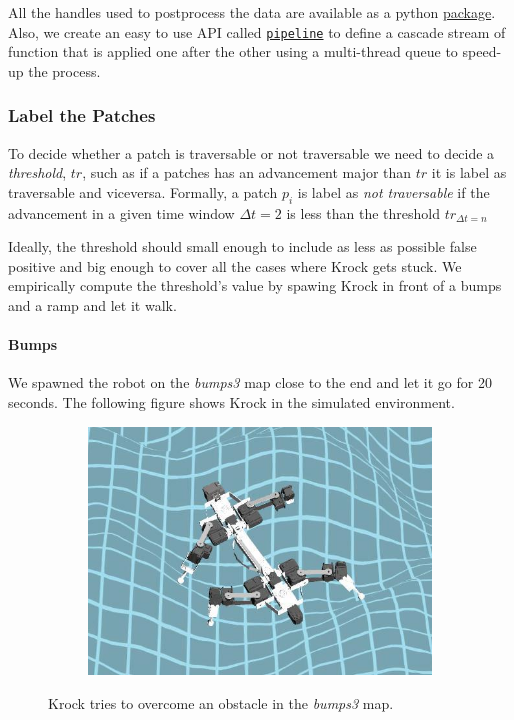 \documentclass[../document.tex]{subfiles}
\begin{document}
All the handles used to postprocess the data are available as a python \href{https://github.com/FrancescoSaverioZuppichini/Master-Thesis/tree/master/core/utilities/postprocessing/handlers}{package}. Also, we create an easy to use API called \href{https://github.com/FrancescoSaverioZuppichini/Master-Thesis/tree/master/core/utilities/pipeline}{\texttt{pipeline}} to define a cascade stream of function that is applied one after the other using a multi-thread queue to speed-up the process.

\subsubsection{Label the Patches}
To decide whether a patch is traversable or not traversable we need to decide a \emph{threshold}, $tr$, such as if a patches has an advancement major than $tr$ it is label as traversable and viceversa. Formally, a patch $p_i$ is label as \emph{not traversable} if the advancement in a given time window $\Delta t = 2$ is less than the threshold $tr_{\Delta t = n}$

Ideally, the threshold should small enough to include as less as possible false positive and big enough to cover all the cases where Krock gets stuck. We empirically compute the threshold's value by spawing Krock in front of a bumps and a ramp and let it walk.
\paragraph{Bumps} We spawned the robot on the \emph{bumps3} map close to the end and let it go for 20 seconds. The following figure shows Krock in the simulated environment.

\begin{figure}[H]
\centering
    \begin{subfigure}[b]{0.45\textwidth}
    \includegraphics[width=\linewidth]{../img/3/find_tr/krock-bumps.jpg}
    \end{subfigure}
\caption{Krock tries to overcome an obstacle in the \emph{bumps3} map.}
\end{figure}
\end{document}
